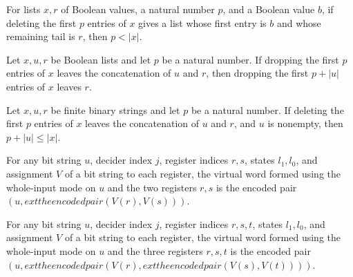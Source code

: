 \begin{lemma}
\label{Complexity.lt_of_drop}
\leanok
{}
For lists $x,r$ of Boolean values, a natural number $p$, and a Boolean value $b$, if
deleting the first $p$ entries of $x$ gives a list whose first entry is $b$ and whose
remaining tail is $r$, then $p<|x|$.
\end{lemma}

\begin{lemma}
\label{Complexity.drop_add_of_drop}
\leanok
{}
Let $x,u,r$ be Boolean lists and let $p$ be a natural number. If dropping the first $p$
entries of $x$ leaves the concatenation of $u$ and $r$, then dropping the first $p+|u|$
entries of $x$ leaves $r$.
\end{lemma}

\begin{lemma}
\label{Complexity.le_of_drop}
\leanok
{}
Let $x,u,r$ be finite binary strings and let $p$ be a natural number. If deleting the
first $p$ entries of $x$ leaves the concatenation of $u$ and $r$, and $u$ is nonempty,
then $p+|u|\le |x|$.
\end{lemma}

\begin{theorem}
\leanok
{}
For any bit string $u$, decider index $j$, register indices $r,s$, states $l_1,l_0$, and
assignment $V$ of a bit string to each register, the virtual word formed using the
whole-input mode on $u$ and the two registers $r,s$ is the encoded pair $(u,	ext{the
encoded pair }(V(r),V(s)))$.
\end{theorem}

\begin{theorem}
\leanok
{}
For any bit string $u$, decider index $j$, register indices $r,s,t$, states $l_1,l_0$,
and assignment $V$ of a bit string to each register, the virtual word formed using the
whole-input mode on $u$ and the three registers $r,s,t$ is the encoded pair $(u,	ext{the
encoded pair }(V(r),	ext{the encoded pair }(V(s),V(t))))$.
\end{theorem}
